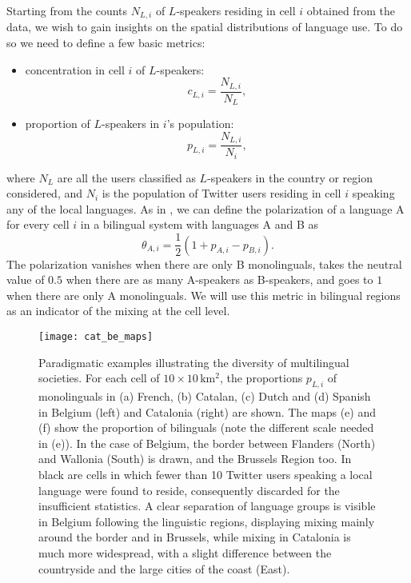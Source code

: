 \documentclass[../thesis.tex]{subfiles}
\begin{document}
Starting from the counts $N_{L,i}$ of $L$-speakers residing in cell $i$ obtained from
the data, we wish to gain insights on the spatial distributions of language use. To do
so we need to define a few basic metrics:
\begin{itemize}
       \item concentration in cell $i$ of $L$-speakers:
       \begin{equation}
       \label{eq:def_conc}
              c_{L,i} = \frac{N_{L,i}}{N_L},
       \end{equation}
       \item proportion of $L$-speakers in $i$'s population:
       \begin{equation}
       \label{eq:def_prop}
              p_{L,i} = \frac{N_{L,i}}{N_i},
       \end{equation}
\end{itemize}
where $N_L$ are all the users classified as $L$-speakers in the country or region
considered, and $N_i$ is the population of Twitter users residing in cell $i$ speaking
any of the local languages. As in \cite{MocanuTwitterBabel2013}, we can define the
polarization of a language A for every cell $i$ in a bilingual system with languages A
and B as 
\begin{equation}
\label{eq:def_polar}
    \theta_{A, i} = \frac{1}{2} (1 + p_{A,i} - p_{B,i}). 
\end{equation}
The polarization vanishes when there are only B monolinguals, takes the neutral value of
$0.5$ when there are as many A-speakers as B-speakers, and goes to $1$ when there are
only A monolinguals. We will use this metric in bilingual regions as an indicator of
the mixing at the cell level. 

\begin{figure*}[p!]
  \centering
  \texttt{[image: cat\_be\_maps]}
  \caption{Paradigmatic examples illustrating the diversity of multilingual societies.
  For each cell of $10 \times 10 \, \si{\kilo \meter \squared}$, the proportions
  $p_{L,i}$ of monolinguals in (a) French, (b) Catalan, (c) Dutch and (d) Spanish in
  Belgium (left) and Catalonia (right) are shown. The maps (e) and (f) show the
  proportion of bilinguals (note the different scale needed in (e)). In the case of
  Belgium, the border between Flanders (North) and Wallonia (South) is drawn, and the
  Brussels Region too. In black are cells in which fewer than 10 Twitter users speaking
  a local language were found to reside, consequently discarded for the insufficient
  statistics. A clear separation of language groups is visible in Belgium following the
  linguistic regions, displaying mixing mainly around the border and in Brussels, while
  mixing in Catalonia is much more widespread, with a slight difference between the
  countryside and the large cities of the coast (East).}
  \label{fig:cat_be_maps}
\end{figure*}
\end{document}
